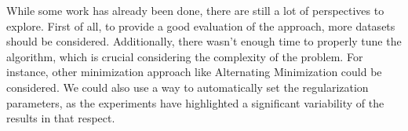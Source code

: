 \documentclass{article}
\begin{document}
While some work has already been done, there are still a lot of perspectives to explore. First of all, to provide a good evaluation of the approach, more datasets should be considered. Additionally, there wasn't enough time to properly tune the algorithm, which is crucial considering the complexity of the problem. For instance, other minimization approach like Alternating Minimization could be considered. We could also use a way to automatically set the regularization parameters, as the experiments have highlighted a significant variability of the results in that respect.




% 

\end{document}
